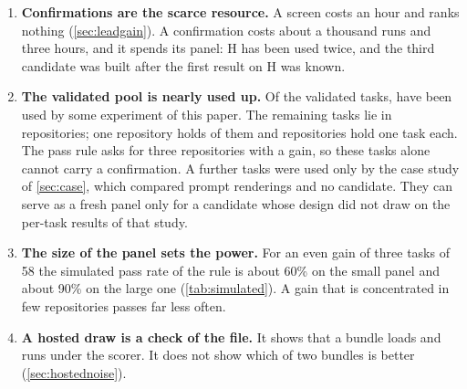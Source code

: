 \begin{enumerate}[leftmargin=*,itemsep=2pt,topsep=3pt]
\item \textbf{Confirmations are the scarce resource.} A screen costs an hour and ranks nothing
(\cref{sec:leadgain}). A confirmation costs about a thousand runs and three hours, and it spends its panel: H has
been used twice, and the third candidate was built after the first result on H was known.
\item \textbf{The validated pool is nearly used up.} Of the \PoolValid{} validated tasks, \PoolUsed{} have been
used by some experiment of this paper. The remaining \PoolUntouched{} tasks lie in \PoolUntouchedRepos{}
repositories; one repository holds \PoolUntouchedTopRepo{} of them and \PoolUntouchedSmallRepos{} repositories hold
one task each. The pass rule asks for three repositories with a gain, so these tasks alone cannot carry a
confirmation. A further \CaseOnlyTasks{} tasks were used only by the case study of \cref{sec:case}, which compared
prompt renderings and no candidate. They can serve as a fresh panel only for a candidate whose design did not draw
on the per-task results of that study.
\item \textbf{The size of the panel sets the power.} For an even gain of three tasks of 58 the simulated pass rate
of the rule is about 60\% on the small panel and about 90\% on the large one (\cref{tab:simulated}). A gain that is
concentrated in few repositories passes far less often.
\item \textbf{A hosted draw is a check of the file.} It shows that a bundle loads and runs under the scorer. It does
not show which of two bundles is better (\cref{sec:hostednoise}).
\end{enumerate}
